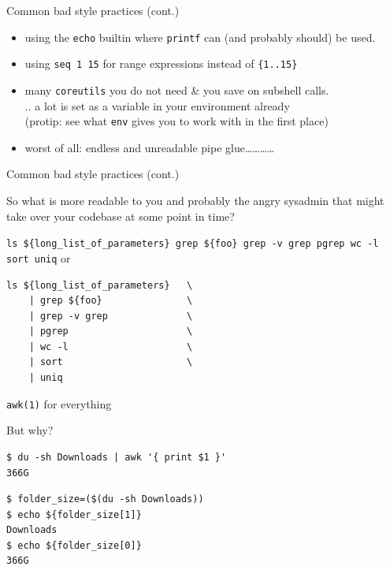 \begin{frame}{Common bad style practices (cont.)}

\begin{itemize}
\itemsep1pt\parskip0pt
\item
  using the \texttt{echo} builtin where \texttt{printf} can (and
  probably should) be used.
\item
  using \texttt{seq 1 15} for range expressions instead of
  \texttt{\{1..15\}}
\item
  many \texttt{coreutils} you do not need \& you save on subshell
  calls.\\ .. a lot is set as a variable in your environment already\\
  (protip: see what \texttt{env} gives you to work with in the first
  place)
\item
  worst of all: endless and unreadable pipe
  glue\ldots{}\ldots{}\ldots{}\ldots{}
\end{itemize}

\end{frame}

\begin{frame}[fragile]{Common bad style practices (cont.)}

So what is more readable to you and probably the angry sysadmin that
might take over your codebase at some point in time? \vspace{20px}

\texttt{ls \$\{long\_list\_of\_parameters\} \textbar{} grep \$\{foo\} \textbar{} grep -v grep \textbar{} pgrep \textbar{} wc -l \textbar{} sort \textbar{} uniq}
\newline
\newline
or

\begin{verbatim}
ls ${long_list_of_parameters}   \
    | grep ${foo}               \
    | grep -v grep              \
    | pgrep                     \
    | wc -l                     \
    | sort                      \
    | uniq
\end{verbatim}

\end{frame}

\begin{frame}[fragile]{\texttt{awk(1)} for everything}

But why?

\begin{verbatim}
$ du -sh Downloads | awk '{ print $1 }'
366G
\end{verbatim}

\begin{verbatim}
$ folder_size=($(du -sh Downloads))
$ echo ${folder_size[1]}
Downloads
$ echo ${folder_size[0]}
366G
\end{verbatim}

\end{frame}

